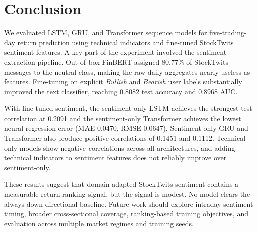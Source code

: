 \documentclass[10pt,twocolumn]{article}
\begin{document}
\section{Conclusion}

We evaluated LSTM, GRU, and Transformer sequence models for five-trading-day return prediction using technical indicators and fine-tuned StockTwits sentiment features. A key part of the experiment involved the sentiment extraction pipeline. Out-of-box FinBERT assigned 80.77\% of StockTwits messages to the neutral class, making the raw daily aggregates nearly useless as features. Fine-tuning on explicit \textit{Bullish} and \textit{Bearish} user labels substantially improved the text classifier, reaching 0.8082 test accuracy and 0.8968 AUC.

With fine-tuned sentiment, the sentiment-only LSTM achieves the strongest test correlation at 0.2091 and the sentiment-only Transformer achieves the lowest neural regression error (MAE 0.0470, RMSE 0.0647). Sentiment-only GRU and Transformer also produce positive correlations of 0.1451 and 0.1112. Technical-only models show negative correlations across all architectures, and adding technical indicators to sentiment features does not reliably improve over sentiment-only.

These results suggest that domain-adapted StockTwits sentiment contains a measurable return-ranking signal, but the signal is modest. No model clears the always-down directional baseline. Future work should explore intraday sentiment timing, broader cross-sectional coverage, ranking-based training objectives, and evaluation across multiple market regimes and training seeds.

\clearpage
\end{document}
